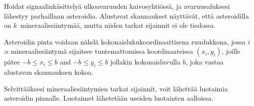 


\noindent
Hoidat signaalinkäsittelyä ulkoavaruuden kaivosyhtiössä, ja avaruusaluksesi lähestyy parhaillaan asteroidia.
Alustavat skannaukset näyttävät, että asteroidilla on $k$~mineraaliesiintymää, mutta niiden tarkat sijainnit ei ole tiedossa.

\medskip


Asteroidin pinta voidaan nähdä kokonaislukukoordinaattisena ruudukkona, jossa
$i$:s mineraaliesiintymä sijaitsee tuntemattomissa koordinaateissa $(x_i, y_i)$, joille pätee 
$-b \le x_i \le b$ and $-b\le y_i \le b$ %
jollakin kokonaisluvulla $b$, joka vastaa alustavan skannauksen kokoa.


Selvittääksesi mineraaliesiintymien tarkat sijainnit, voit lähettää luotaimia asteroidin pinnalle.
Luotaimet lähetetään useiden luotainten aalloissa.


